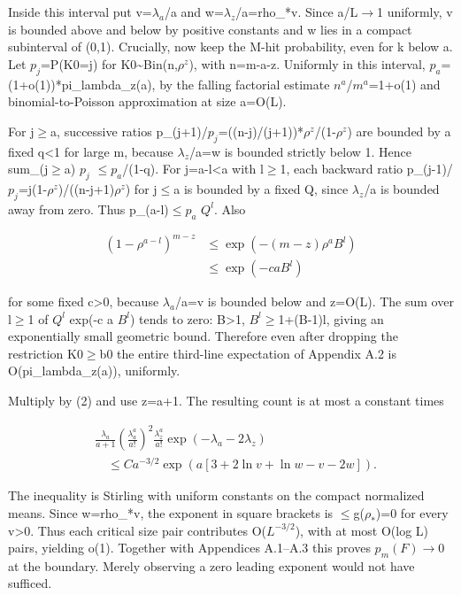 \documentclass[11pt]{article}
\begin{document}
Inside this interval put v=$\lambda_{a}$/a and w=$\lambda_{z}$/a=rho\_*v. Since a/L\ensuremath{\to}1 uniformly, v is bounded above and below by positive constants and w lies in a compact subinterval of (0,1). Crucially, now keep the M-hit probability, even for k below a. Let $p_{j}$=P(K0=j) for K0\textasciitilde{}Bin(n,$\rho^{z}$), with n=m-a-z. Uniformly in this interval, $p_{a}$=(1+o(1))*pi\_lambda\_z(a), by the falling factorial estimate $n^{a}$/$m^{a}$=1+o(1) and binomial-to-Poisson approximation at size a=O(L).

For j\ensuremath{\geq}a, successive ratios p\_(j+1)/$p_{j}$=((n-j)/(j+1))*$\rho^{z}$/(1-$\rho^{z}$) are bounded by a fixed q<1 for large m, because $\lambda_{z}$/a=w is bounded strictly below 1. Hence sum\_(j\ensuremath{\geq}a) $p_{j}$ \ensuremath{\leq}$p_{a}$/(1-q). For j=a-l<a with l\ensuremath{\geq}1, each backward ratio p\_(j-1)/$p_{j}$=j(1-$\rho^{z}$)/((n-j+1)$\rho^{z}$) for j\ensuremath{\leq}a is bounded by a fixed Q, since $\lambda_{z}$/a is bounded away from zero. Thus p\_(a-l)\ensuremath{\leq}$p_{a}$ $Q^{l}$. Also

\[
\begin{aligned}(1-\rho^{a-l})^{m-z}&\leq\exp(-(m-z)\rho^a B^l)\\&\leq\exp(-ca B^l)\end{aligned}
\]

for some fixed c>0, because $\lambda_{a}$/a=v is bounded below and z=O(L). The sum over l\ensuremath{\geq}1 of $Q^{l}$ exp(-c a $B^{l}$) tends to zero: B>1, $B^{l}$\ensuremath{\geq}1+(B-1)l, giving an exponentially small geometric bound. Therefore even after dropping the restriction K0\ensuremath{\geq}b0 the entire third-line expectation of Appendix A.2 is O(pi\_lambda\_z(a)), uniformly.

Multiply by (2) and use z=a+1. The resulting count is at most a constant times

\[
 \begin{aligned}
 &\frac{\lambda_a}{a+1}\left(\frac{\lambda_a^a}{a!}\right)^2\frac{\lambda_z^a}{a!}\exp(-\lambda_a-2\lambda_z)\\
 &\quad{}\leq Ca^{-3/2}\exp(a[3+2\ln v+\ln w-v-2w]).
\end{aligned}
\]

The inequality is Stirling with uniform constants on the compact normalized means. Since w=rho\_*v, the exponent in square brackets is \ensuremath{\leq}g($\rho_{*}$)=0 for every v>0. Thus each critical size pair contributes O($L^{-3/2}$), with at most O(log L) pairs, yielding o(1). Together with Appendices A.1--A.3 this proves $p_m(F)$\ensuremath{\to}0 at the boundary. Merely observing a zero leading exponent would not have sufficed.
\end{document}
